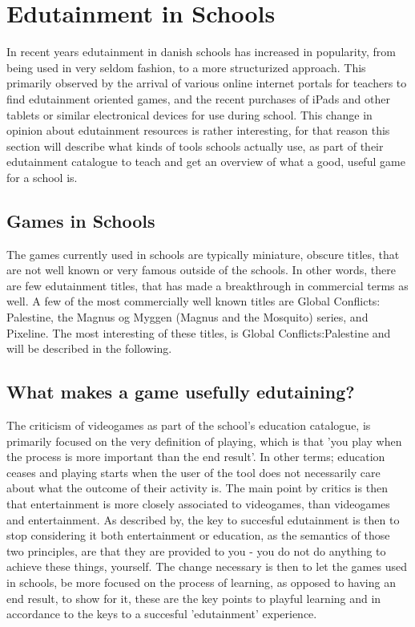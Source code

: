 \section{Edutainment in Schools}
\label{sec:eduinsch}
In recent years edutainment in danish schools has increased in popularity, from being used in very seldom fashion, to a more structurized approach. 
This primarily observed by the arrival of various online internet portals for teachers to find edutainment oriented games, and the recent purchases of
iPads and other tablets or similar electronical devices for use during school. This change in opinion about edutainment resources is rather 
interesting, for that reason this section will describe what kinds of tools schools actually use, as part of their edutainment catalogue to teach and 
get an overview of what a good, useful game for a school is.


\subsection{Games in Schools}

The games currently used in schools are typically miniature, obscure titles, that are not well known or very famous outside of the schools. In other 
words, there are few edutainment titles, that has made a breakthrough in commercial terms as well. A few of the most commercially well known titles are 
Global Conflicts: Palestine, the Magnus og Myggen (Magnus and the Mosquito) series, and Pixeline. The most interesting of these titles, is Global 
Conflicts:Palestine and will be described in the following.


\subsection{What makes a game usefully edutaining?}

The criticism of videogames as part of the school's education catalogue, is primarily focused on the very definition of playing, which is that 'you 
play when the process is more important than the end result'. In other terms; education ceases and playing starts when the user of the tool does not 
necessarily care about what the outcome of their activity is. The main point by critics is then that entertainment is more closely associated to 
videogames, than videogames and entertainment. As described by\cite{edunoty}, the key to succesful edutainment is then to stop considering it both 
entertainment or education, as the semantics of those two principles, are that they are provided to you - you do not do anything to achieve these 
things, yourself. The change necessary is then to let the games used in schools, be more focused on the process of learning, as opposed to having an 
end result, to show for it, these are the key points to playful learning and in accordance to \cite{edunoty} the keys to a succesful 'edutainment' 
experience.

